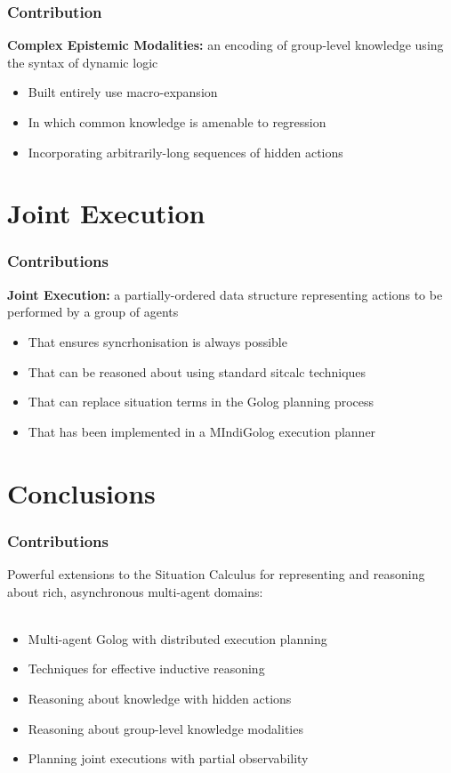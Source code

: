 \documentclass{beamer}
\begin{document}
\begin{frame}
\frametitle{Contribution}
\textbf{Complex Epistemic Modalities:}  an encoding of group-level knowledge using the syntax of dynamic logic
\begin{itemize}
\item Built entirely use macro-expansion
\item In which common knowledge is amenable to regression
\item Incorporating arbitrarily-long sequences of hidden actions
\end{itemize}
\end{frame}

\section{Joint Execution}

\begin{frame}
\end{frame}

\begin{frame}
\frametitle{Contributions}
\textbf{Joint Execution:}  a partially-ordered data structure representing actions to be performed by a group of agents
\begin{itemize}
\item That ensures syncrhonisation is always possible
\item That can be reasoned about using standard sitcalc techniques
\item That can replace situation terms in the Golog planning process
\item That has been implemented in a MIndiGolog execution planner
\end{itemize}
\end{frame}

\section{Conclusions}

\begin{frame}
  \frametitle{Contributions}
  Powerful extensions to the Situation Calculus for representing and reasoning
  about rich, asynchronous multi-agent domains:
  \ \\
  \ \\
  \begin{itemize}
  \item Multi-agent Golog with distributed execution planning
  \item Techniques for effective inductive reasoning
  \item Reasoning about knowledge with hidden actions
  \item Reasoning about group-level knowledge modalities
  \item Planning joint executions with partial observability
  \end{itemize}
\end{frame}
\end{document}
